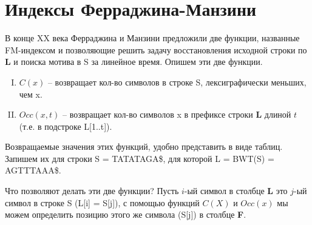 \documentclass[letterpaper, 11pt]{article}
\begin{document}
\section{Индексы Ферраджина-Манзини}

В конце XX века Ферраджина и Манзини предложили две функции, названные FM-индексом и позволяющие решить задачу восстановления исходной строки по \textbf{L} и поиска мотива в S за линейное время. Опишем эти две функции.
\begin{enumerate}[I.]
\item
$C(x)$ -- возвращает кол-во символов в строке S, лексиграфически меньших, чем x.
\item
$Occ(x, t)$ -- возвращает кол-во символов x в префиксе строки \textbf{L} длиной $t$ (т.е. в подстроке L[1..t]).
\end{enumerate}

Возвращаемые значения этих функций, удобно представить в виде таблиц. Запишем их для строки S = TATATAGA\$, для которой L = BWT(S) = AGTTTAAA\$.

\begin{table}[H]
\caption{$C(x)$}
\end{table}

\begin{table}[H]
\caption{$Occ(x, t)$}
\end{table}

Что позволяют делать эти две функции? Пусть $i$-ый символ в столбце \textbf{L} это $j$-ый символ в строке S (L[i] = S[j]), с помощью функций $C(X)$ и $Occ(x)$ мы можем определить позицию этого же символа (S[j]) в столбце \textbf{F}. 
\end{document}
